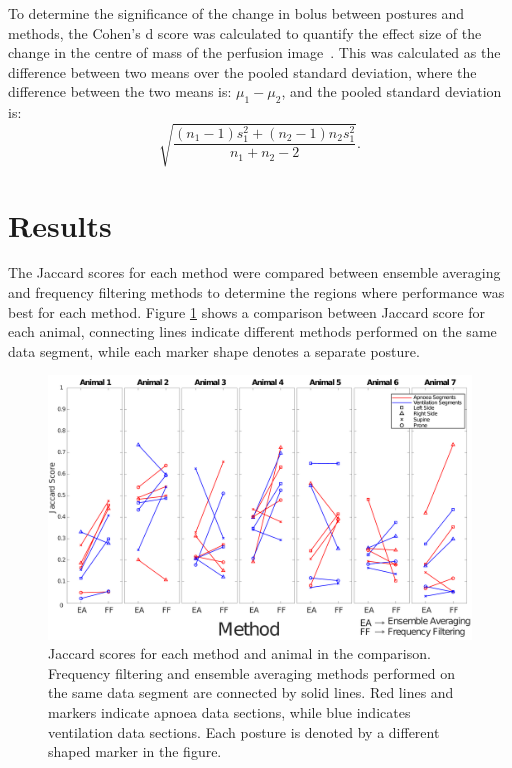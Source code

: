 To determine the significance of the change in bolus between postures
and methods, the Cohen's d score was calculated to quantify the effect size of
the change in the centre of mass of the perfusion image~\parencite{cohen_statistical_1977}.  
This was calculated as the difference between two means over the pooled standard deviation,
where the difference between the two means is: $\mu_1-\mu_2$, and the pooled
standard deviation is: 
\begin{equation}
{\sqrt{\frac{(n_1-1)s^2_1+(n_2-1)n_2s^2_1}{n_1+n_2-2}}}. 
\end{equation}

\section{Results}                         %

The Jaccard scores for each method were compared between 
ensemble averaging and frequency filtering methods to determine the regions where performance 
was best for each method. Figure \ref{fig:resultsJaccard} shows a 
comparison between Jaccard score for each animal, connecting lines 
indicate different methods performed on the same data segment, while each marker shape
denotes a separate posture.

\begin{figure}[H]
\centering
\includegraphics[width=\textwidth]{chapter3-perfusion_analysis/imgs/fig-resultsJaccard.pdf}
\caption[Jaccard index scores]{\label{fig:resultsJaccard}%
Jaccard scores for each method and animal in the comparison. Frequency 
filtering and ensemble averaging methods performed on the same data segment are 
connected by solid lines. Red lines and markers indicate apnoea data sections, 
while blue indicates ventilation data sections. Each posture is denoted by a different
shaped marker in the figure.
}
\end{figure}


